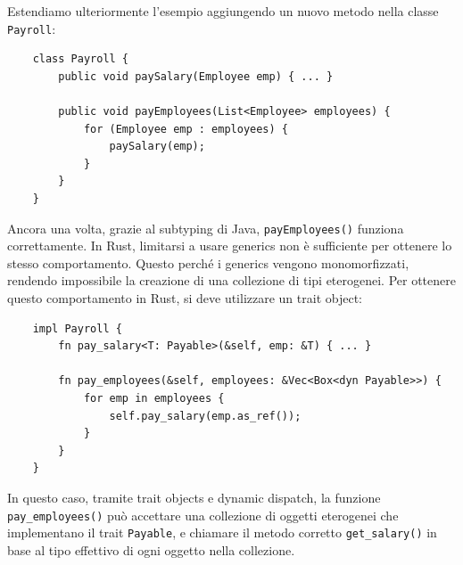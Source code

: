 Estendiamo ulteriormente l'esempio aggiungendo un nuovo metodo nella classe \texttt{Payroll}:
\begin{verbatim}
    class Payroll {
        public void paySalary(Employee emp) { ... }

        public void payEmployees(List<Employee> employees) {
            for (Employee emp : employees) {
                paySalary(emp);
            }
        }
    }
\end{verbatim}
Ancora una volta, grazie al subtyping di Java, \texttt{payEmployees()} funziona correttamente. In Rust, limitarsi a usare generics non è sufficiente per ottenere lo stesso comportamento. Questo perché i generics vengono monomorfizzati, rendendo impossibile la creazione di una collezione di tipi eterogenei. Per ottenere questo comportamento in Rust, si deve utilizzare un trait object:
\begin{verbatim}
    impl Payroll {
        fn pay_salary<T: Payable>(&self, emp: &T) { ... }

        fn pay_employees(&self, employees: &Vec<Box<dyn Payable>>) {
            for emp in employees {
                self.pay_salary(emp.as_ref());
            }
        }
    }
\end{verbatim}
In questo caso, tramite trait objects e dynamic dispatch, la funzione \texttt{pay\_employees()} può accettare una collezione di oggetti eterogenei che implementano il trait \texttt{Payable}, e chiamare il metodo corretto \texttt{get\_salary()} in base al tipo effettivo di ogni oggetto nella collezione. 

